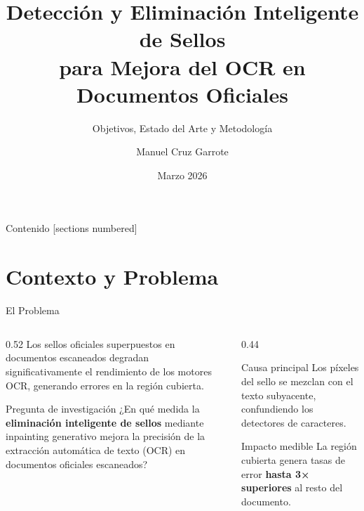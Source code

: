 \documentclass[aspectratio=169, 11pt]{beamer}
\title{Detección y Eliminación Inteligente de Sellos\\para Mejora del OCR en Documentos Oficiales}
\subtitle{Objetivos, Estado del Arte y Metodología}
\author{Manuel Cruz Garrote}
\institute{Universidad del Rosario · Visión por Computador 2026-I}
\date{Marzo 2026}
\begin{document}

\begin{frame}[plain]
  \maketitle
\end{frame}

\begin{frame}{Contenido}
  [sections numbered]
  \tableofcontents[hideallsubsections]
\end{frame}

\section{Contexto y Problema}

\begin{frame}{El Problema}
  \begin{columns}[T]
    \begin{column}{0.52\textwidth}
      Los sellos oficiales superpuestos en documentos escaneados \alert{degradan significativamente} el rendimiento de los motores OCR, generando errores en la región cubierta.
      \vspace{12pt}
      \begin{block}{Pregunta de investigación}
        ¿En qué medida la \textbf{eliminación inteligente de sellos} mediante inpainting generativo mejora la precisión de la extracción automática de texto (OCR) en documentos oficiales escaneados?
      \end{block}
    \end{column}
    \begin{column}{0.44\textwidth}
      \begin{alertblock}{Causa principal}
        Los píxeles del sello se mezclan con el texto subyacente, confundiendo los detectores de caracteres.
      \end{alertblock}
      \vspace{8pt}
      \begin{exampleblock}{Impacto medible}
        La región cubierta genera tasas de error \textbf{hasta 3× superiores} al resto del documento.
      \end{exampleblock}
    \end{column}
  \end{columns}
\end{frame}
\end{document}
